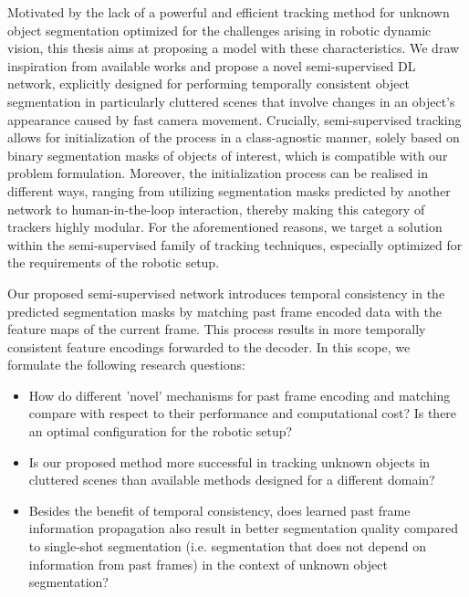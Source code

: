 Motivated by the lack of a powerful and efficient tracking method for unknown object segmentation
optimized for the challenges arising in robotic dynamic vision, this thesis aims at proposing a model with these characteristics.
We draw inspiration from available works and propose a novel semi-supervised \gls{DL} network, explicitly designed for performing temporally consistent object segmentation in particularly cluttered scenes that involve changes in an object's appearance caused by fast camera movement. 
Crucially, semi-supervised tracking allows for initialization of the process in a class-agnostic manner, solely based on binary segmentation masks of objects of interest, which is compatible with our problem formulation. Moreover, the initialization process can be realised in different ways, ranging from utilizing segmentation masks predicted by another network to human-in-the-loop interaction, thereby making this category of trackers highly modular.
For the aforementioned reasons, we target a solution within the semi-supervised family of tracking techniques, especially optimized for the requirements of the robotic setup.

Our proposed semi-supervised network introduces temporal consistency in the predicted segmentation masks by matching past frame encoded data with the feature maps of the current frame. 
This process results in more temporally consistent feature encodings forwarded to the decoder.
In this scope, we formulate the following research questions:

\begin{itemize}
    \item How do different 'novel' mechanisms for past frame encoding and matching compare with respect to their performance and computational cost? Is there an optimal configuration for the robotic setup? 
    \item Is our proposed method more successful in tracking unknown objects in cluttered scenes than available methods designed for a different domain?

    \item  Besides the benefit of temporal consistency, does learned past frame information propagation also result in better segmentation quality compared to single-shot segmentation (i.e. segmentation that does not depend on information from past frames) in the context of unknown object segmentation?
\end{itemize}



